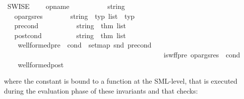 \begin{isabellebody}
\begin{isamarkuptext}
\begin{isarbox}

\begin{isabelle}
\ SWIS{\isacharunderscore}{\kern0pt}E\ {\isacharequal}{\kern0pt}\isanewline
\ \ \ op{\isacharunderscore}{\kern0pt}name\ \ \ \ \ \ \ \ \ \ {\isacharcolon}{\kern0pt}{\isacharcolon}{\kern0pt}\ {\isachardoublequoteopen}string{\isachardoublequoteclose}\isanewline
\ \ \ op{\isacharunderscore}{\kern0pt}args{\isacharunderscore}{\kern0pt}res\ \ \ \ \ \ \ {\isacharcolon}{\kern0pt}{\isacharcolon}{\kern0pt}\ {\isachardoublequoteopen}{\isacharparenleft}{\kern0pt}string\ {\isasymtimes}\ typ{\isacharparenright}{\kern0pt}\ list\ {\isasymtimes}\ typ{\isachardoublequoteclose}\ %
\isanewline
\ \ \ pre{\isacharunderscore}{\kern0pt}cond\ \ \ \ \ \ \ \ \ \ {\isacharcolon}{\kern0pt}{\isacharcolon}{\kern0pt}\ {\isachardoublequoteopen}{\isacharparenleft}{\kern0pt}string\ {\isasymtimes}\ thm{\isacharparenright}{\kern0pt}\ list{\isachardoublequoteclose}\ \ \ \ \ \ \ \ %
\isanewline
\ \ \ post{\isacharunderscore}{\kern0pt}cond\ \ \ \ \ \ \ \ \ {\isacharcolon}{\kern0pt}{\isacharcolon}{\kern0pt}\ {\isachardoublequoteopen}{\isacharparenleft}{\kern0pt}string\ {\isasymtimes}\ thm{\isacharparenright}{\kern0pt}\ list{\isachardoublequoteclose}\ \ \ \ \ \ \ \ %
\isanewline
\ \ \ \ well{\isacharunderscore}{\kern0pt}formed{\isacharunderscore}{\kern0pt}pre\ {\isacharcolon}{\kern0pt}{\isacharcolon}{\kern0pt}\ {\isachardoublequoteopen}{\isasymforall}cond\ {\isasymin}\ set{\isacharparenleft}{\kern0pt}map\ snd\ {\isacharparenleft}{\kern0pt}pre{\isacharunderscore}{\kern0pt}cond\ {\isasymsigma}{\isacharparenright}{\kern0pt}{\isacharparenright}{\kern0pt}{\isachardot}{\kern0pt}\ \isanewline
\ \ \ \ \ \ \ \ \ \ \ \ \ \ \ \ \ \ \ \ \ \ \ \ \ \ \ \ \ \ \ \ \ \ \ \ \ \ \ \ \ \ \ \ \ \ iswff\isactrlsub p\isactrlsub r\isactrlsub e\ {\isacharparenleft}{\kern0pt}op{\isacharunderscore}{\kern0pt}args{\isacharunderscore}{\kern0pt}res\ {\isasymsigma}{\isacharparenright}{\kern0pt}\ {\isacharparenleft}{\kern0pt}cond{\isacharparenright}{\kern0pt}{\isachardoublequoteclose}\isanewline
\ \ \ \ well{\isacharunderscore}{\kern0pt}formed{\isacharunderscore}{\kern0pt}post{\isacharcolon}{\kern0pt}{\isacharcolon}{\kern0pt}\ \isacommand{{\isachardot}{\kern0pt}{\isachardot}{\kern0pt}}\isacommand{{\isachardot}{\kern0pt}}
\end{isabelle}
\end{isarbox}
where the constant  is bound to a function at the SML-level, that
is executed during the evaluation phase of these invariants and that checks:


\end{isamarkuptext}
\end{isabellebody}
